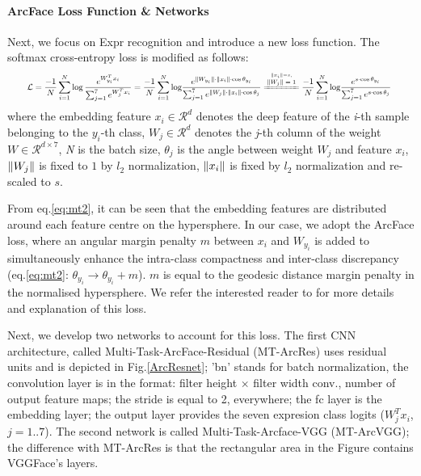 \documentclass{bmvc2k}
\newcommand\numeq[1]{\stackrel{\scriptscriptstyle \mkern-1.5mu#1 \mkern-1.5mu}{\eqdef}}
\DeclarePairedDelimiter{\norm}{\lVert}{\rVert}
\begin{document}
\paragraph{ArcFace Loss Function \& Networks}
Next, we focus on Expr recognition and  introduce a new loss function. The softmax cross-entropy loss is modified as follows:
\begin{align}
\resizebox{.94\hsize}{!}{$\displaystyle{
\mathcal{L} = \frac{-1}{N} \sum_{i=1}^{N} {\log\frac{e^{W_{y_i}^Tx_i}}{\sum_{j=1}^{7}{e^{W_{j}^Tx_i}}} } = \frac{-1}{N} \sum_{i=1}^{N} {\text{log}\frac{e^{\norm{W_{y_i}} \cdot \norm{x_i} \cdot  \cos{\theta_{y_i}} }}{\sum_{j=1}^{7}{e^{\norm{W_j} \cdot \norm{x_i} \cdot  \cos{\theta_{j}}} }} }   \numeq {\norm{x_i}=s,} \frac{-1}{N} \sum_{i=1}^{N} {\text{log}\frac{e^{s\cdot \cos{\theta_{y_i}}  }}{\sum_{j=1}^{7}{e^{s\cdot \cos{\theta_{j} }} } } }
}$
}
\label{eq:mt2}
\end{align}
\noindent where the embedding feature $x_i \in \mathcal{R}^d$  denotes the deep feature of the \textit{i}-th sample belonging to the $y_i$-th class, $W_j \in \mathcal{R}^d$ denotes the \textit{j}-th column of the weight $W \in \mathcal{R}^{d \times 7}$, \textit{N} is the batch size, $\theta_j$ is the angle between weight $W_j$ and feature $x_i$, $\norm{W_j}$ is fixed to \textit{$1$} by \textit{$l_2$} normalization, $\norm{x_i}$ is fixed by \textit{$l_2$} normalization and re-scaled to \textit{$s$}.

From eq.\ref{eq:mt2}, it can be seen that the embedding features are distributed around each feature centre on the hypersphere. In our case, we adopt the ArcFace loss, where an angular margin penalty \textit{$m$} between $x_i$  and $W_{y_i}$ is added to simultaneously
enhance the intra-class compactness and inter-class discrepancy (eq.\ref{eq:mt2}: $\theta_{y_i} \xrightarrow{} \theta_{y_i} + m$).  \textit{$m$} is equal to the geodesic distance margin penalty in the normalised hypersphere. We refer the interested reader to \cite{deng2018arcface} for more details and explanation of this loss.


Next, we develop two networks to account for this loss. The first CNN architecture, called Multi-Task-ArcFace-Residual (MT-ArcRes) uses residual units and is depicted in Fig.\ref{ArcResnet}; 'bn' stands for batch normalization, the convolution layer is in the format: filter height $\times$ filter width conv., number of output feature maps; the stride is equal to 2, everywhere; the fc layer is the embedding layer; the output layer provides the seven expresion class logits ($W_j^T x_i$, $j=1..7$). The second network is called  Multi-Task-Arcface-VGG (MT-ArcVGG); the difference with MT-ArcRes is that the rectangular area in the Figure contains VGGFace's  layers. 
\end{document}

